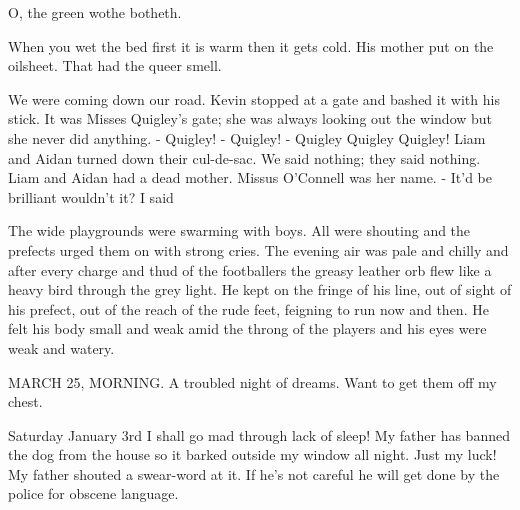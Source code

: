 \documentclass[11pt]{article}
\newenvironment{narrow}[2]{%
 \begin{list}{}{%
  \setlength{\topsep}{0pt}%
  \setlength{\leftmargin}{#1}%
  \setlength{\rightmargin}{#2}%
  \setlength{\listparindent}{\parindent}%
  \setlength{\itemindent}{\parindent}%
  \setlength{\parsep}{\parskip}%
 }%
\item[]}{\end{list}}
\begin{document}
\begin{itemize}
\begin{narrow}{1.0cm}{1.0cm}
    O, the green wothe botheth.

When you wet the bed first it is warm then it gets cold. His mother put
on the oilsheet. That had the queer smell.
\end{narrow}



\item 
\begin{narrow}{1.0cm}{1.0cm}
We were coming down our road. Kevin stopped at a gate and bashed it with his stick. It was Misses Quigley's gate; she was always looking out the window but she never did anything.
- Quigley! 
- Quigley! 
- Quigley Quigley Quigley!
Liam and Aidan turned down their cul-de-sac. We said nothing; they said nothing. Liam and Aidan had a dead mother. Missus O'Connell was her name.
- It'd be brilliant wouldn't it? I said
\end{narrow}





\item 
\begin{narrow}{1.0cm}{1.0cm}
The wide playgrounds were swarming with boys. All were shouting and the
prefects urged them on with strong cries. The evening air was pale and
chilly and after every charge and thud of the footballers the greasy
leather orb flew like a heavy bird through the grey light. He kept on
the fringe of his line, out of sight of his prefect, out of the reach
of the rude feet, feigning to run now and then. He felt his body small
and weak amid the throng of the players and his eyes were weak and
watery.
\end{narrow}



\item
\begin{narrow}{1.0cm}{1.0cm}
MARCH 25, MORNING. A troubled night of dreams. Want to get them off my
chest.
\end{narrow}



\item 
\begin{narrow}{1.0cm}{1.0cm}
Saturday January 3rd
I shall go mad through lack of sleep! My father has banned the dog from the 
house so it barked outside my window all night. Just my luck! 
My father shouted a swear-word at it. If he's not careful he will get done by
 the police for obscene language.
\end{narrow}


\end{itemize}
\end{document}
